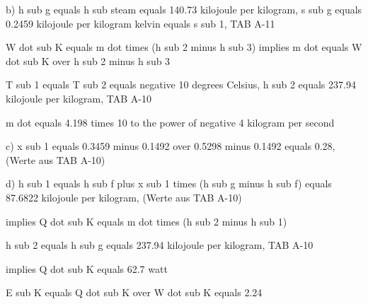 b) h sub g equals h sub steam equals 140.73 kilojoule per kilogram, s sub g equals 0.2459 kilojoule per kilogram kelvin equals s sub 1, TAB A-11

W dot sub K equals m dot times (h sub 2 minus h sub 3) implies m dot equals W dot sub K over h sub 2 minus h sub 3

T sub 1 equals T sub 2 equals negative 10 degrees Celsius, h sub 2 equals 237.94 kilojoule per kilogram, TAB A-10

m dot equals 4.198 times 10 to the power of negative 4 kilogram per second

c) x sub 1 equals 0.3459 minus 0.1492 over 0.5298 minus 0.1492 equals 0.28, (Werte aus TAB A-10)

d) h sub 1 equals h sub f plus x sub 1 times (h sub g minus h sub f) equals 87.6822 kilojoule per kilogram, (Werte aus TAB A-10)

implies Q dot sub K equals m dot times (h sub 2 minus h sub 1)

h sub 2 equals h sub g equals 237.94 kilojoule per kilogram, TAB A-10

implies Q dot sub K equals 62.7 watt

E sub K equals Q dot sub K over W dot sub K equals 2.24